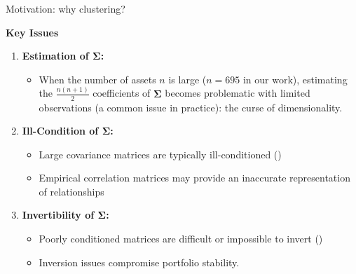 \documentclass[dvipsnames,mathserif]{beamer}
\newcommand\mypv{\vfill \ifthenelse{\boolean{withPause}}{ \pause }{}}
\begin{document}
\begin{frame}{Motivation: why clustering?}

\vfill 

\textbf{Key Issues}
\begin{enumerate}
    \item \textbf{Estimation of \( \boldsymbol{\Sigma} \):}
        \begin{itemize}
            \item When the number of assets \( n \) is large (\( n = 695 \) in our work), estimating the \( \frac{n(n+1)}{2} \) coefficients of \( \boldsymbol{\Sigma} \) becomes problematic with limited observations (a common issue in practice): the curse of dimensionality.
        \end{itemize}

    \item \textbf{Ill-Condition of \( \boldsymbol{\Sigma} \):}
        \begin{itemize}
            \item Large covariance matrices are typically ill-conditioned (\cite{laloux})
            \item Empirical correlation matrices may provide an inaccurate representation of relationships
        \end{itemize}
    
    \item \textbf{Invertibility of \( \boldsymbol{\Sigma} \):}
        \begin{itemize}
            \item Poorly conditioned matrices are difficult or impossible to invert (\cite{LedoitWolfConditionning})
            \item Inversion issues compromise portfolio stability.
        \end{itemize}
\end{enumerate}

\vfill 

\centering
\textbf{}

\end{frame}

\end{document}
